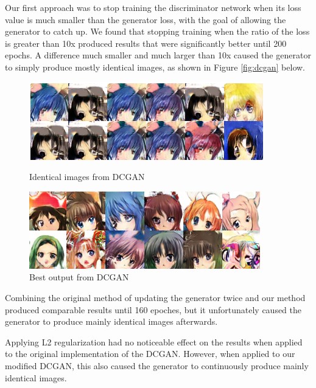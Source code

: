 \documentclass{article} %
\begin{document}
Our first approach was to stop training the discriminator network when its loss value is much smaller than the generator loss, with the goal of allowing the generator to catch up.  We found that stopping training when the ratio of the loss is greater than 10x produced results that were significantly better until 200 epochs. A difference much smaller and much larger than 10x caused the generator to simply produce mostly identical images, as shown in Figure \ref{fig:dcgan} below.

\begin{figure}[h!]
	\begin{minipage}{0.49\linewidth}
		\centering
		\includegraphics[width=0.95\linewidth]{greyson-dcgan.png}
		\caption{Identical images from DCGAN} %
		\label{fig:dcgan}
	\end{minipage}
	\begin{minipage}{0.49\linewidth}
		\centering
		\includegraphics[width=0.95\linewidth]{greyson-dcgan-best.png}
		\caption{Best output from DCGAN} %
		\label{fig:dcgan-best}
	\end{minipage}

\end{figure}

Combining the original method of updating the generator twice and our method produced comparable results until 160 epoches, but it unfortunately caused the generator to produce mainly identical images afterwards.

Applying L2 regularization had no noticeable effect on the results when applied to the original implementation of the DCGAN. However, when applied to our modified DCGAN, this also caused the generator to continuously produce mainly identical images.
\end{document}

